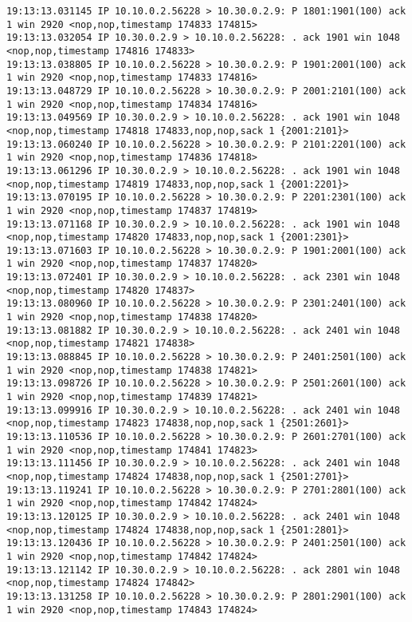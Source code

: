\documentclass[a4paper,12pt]{article}
\begin{document}
\begin{lstlisting}
19:13:13.031145 IP 10.10.0.2.56228 > 10.30.0.2.9: P 1801:1901(100) ack 1 win 2920 <nop,nop,timestamp 174833 174815>
19:13:13.032054 IP 10.30.0.2.9 > 10.10.0.2.56228: . ack 1901 win 1048 <nop,nop,timestamp 174816 174833>
19:13:13.038805 IP 10.10.0.2.56228 > 10.30.0.2.9: P 1901:2001(100) ack 1 win 2920 <nop,nop,timestamp 174833 174816>
19:13:13.048729 IP 10.10.0.2.56228 > 10.30.0.2.9: P 2001:2101(100) ack 1 win 2920 <nop,nop,timestamp 174834 174816>
19:13:13.049569 IP 10.30.0.2.9 > 10.10.0.2.56228: . ack 1901 win 1048 <nop,nop,timestamp 174818 174833,nop,nop,sack 1 {2001:2101}>
19:13:13.060240 IP 10.10.0.2.56228 > 10.30.0.2.9: P 2101:2201(100) ack 1 win 2920 <nop,nop,timestamp 174836 174818>
19:13:13.061296 IP 10.30.0.2.9 > 10.10.0.2.56228: . ack 1901 win 1048 <nop,nop,timestamp 174819 174833,nop,nop,sack 1 {2001:2201}>
19:13:13.070195 IP 10.10.0.2.56228 > 10.30.0.2.9: P 2201:2301(100) ack 1 win 2920 <nop,nop,timestamp 174837 174819>
19:13:13.071168 IP 10.30.0.2.9 > 10.10.0.2.56228: . ack 1901 win 1048 <nop,nop,timestamp 174820 174833,nop,nop,sack 1 {2001:2301}>
19:13:13.071603 IP 10.10.0.2.56228 > 10.30.0.2.9: P 1901:2001(100) ack 1 win 2920 <nop,nop,timestamp 174837 174820>
19:13:13.072401 IP 10.30.0.2.9 > 10.10.0.2.56228: . ack 2301 win 1048 <nop,nop,timestamp 174820 174837>
19:13:13.080960 IP 10.10.0.2.56228 > 10.30.0.2.9: P 2301:2401(100) ack 1 win 2920 <nop,nop,timestamp 174838 174820>
19:13:13.081882 IP 10.30.0.2.9 > 10.10.0.2.56228: . ack 2401 win 1048 <nop,nop,timestamp 174821 174838>
19:13:13.088845 IP 10.10.0.2.56228 > 10.30.0.2.9: P 2401:2501(100) ack 1 win 2920 <nop,nop,timestamp 174838 174821>
19:13:13.098726 IP 10.10.0.2.56228 > 10.30.0.2.9: P 2501:2601(100) ack 1 win 2920 <nop,nop,timestamp 174839 174821>
19:13:13.099916 IP 10.30.0.2.9 > 10.10.0.2.56228: . ack 2401 win 1048 <nop,nop,timestamp 174823 174838,nop,nop,sack 1 {2501:2601}>
19:13:13.110536 IP 10.10.0.2.56228 > 10.30.0.2.9: P 2601:2701(100) ack 1 win 2920 <nop,nop,timestamp 174841 174823>
19:13:13.111456 IP 10.30.0.2.9 > 10.10.0.2.56228: . ack 2401 win 1048 <nop,nop,timestamp 174824 174838,nop,nop,sack 1 {2501:2701}>
19:13:13.119241 IP 10.10.0.2.56228 > 10.30.0.2.9: P 2701:2801(100) ack 1 win 2920 <nop,nop,timestamp 174842 174824>
19:13:13.120125 IP 10.30.0.2.9 > 10.10.0.2.56228: . ack 2401 win 1048 <nop,nop,timestamp 174824 174838,nop,nop,sack 1 {2501:2801}>
19:13:13.120436 IP 10.10.0.2.56228 > 10.30.0.2.9: P 2401:2501(100) ack 1 win 2920 <nop,nop,timestamp 174842 174824>
19:13:13.121142 IP 10.30.0.2.9 > 10.10.0.2.56228: . ack 2801 win 1048 <nop,nop,timestamp 174824 174842>
19:13:13.131258 IP 10.10.0.2.56228 > 10.30.0.2.9: P 2801:2901(100) ack 1 win 2920 <nop,nop,timestamp 174843 174824>

\end{lstlisting}
\end{document}
